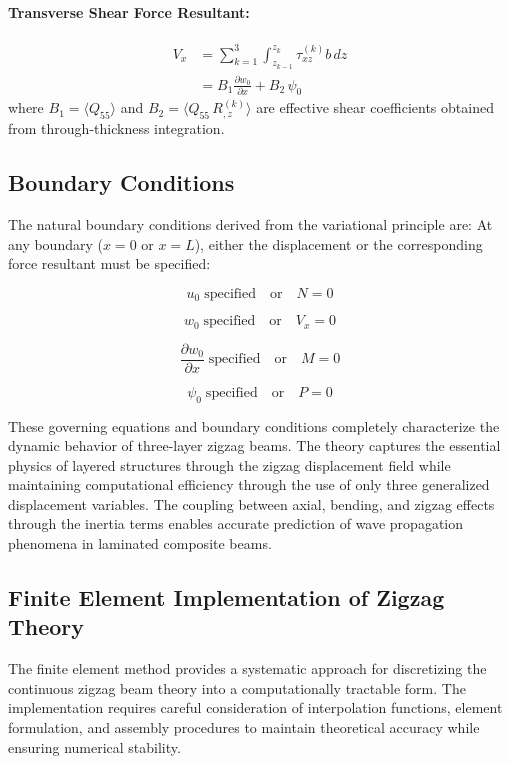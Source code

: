 \documentclass[12pt,a4paper]{report}
\begin{document}
\paragraph{Transverse Shear Force Resultant:}
\begin{align}
V_x &= \sum_{k=1}^{3} \int_{z_{k-1}}^{z_k} \tau_{xz}^{(k)} b \, dz \nonumber \\
    &= B_{1} \frac{\partial w_0}{\partial x} + B_{2} \, \psi_0
\end{align}
where $B_{1} = \langle Q_{55} \rangle$ and $B_{2} = \langle Q_{55} \, R^{(k)}_{,z} \rangle$ are effective shear coefficients obtained from through-thickness integration.

\subsection*{Boundary Conditions}

The natural boundary conditions derived from the variational principle are:  
At any boundary ($x = 0$ or $x = L$), either the displacement or the corresponding force resultant must be specified:

\[
u_0 \; \text{specified} \quad \text{or} \quad N = 0
\]

\[
w_0 \; \text{specified} \quad \text{or} \quad V_x = 0
\]

\[
\frac{\partial w_0}{\partial x} \; \text{specified} \quad \text{or} \quad M = 0
\]

\[
\psi_0 \; \text{specified} \quad \text{or} \quad P = 0
\]

These governing equations and boundary conditions completely characterize the dynamic behavior of three-layer zigzag beams. The theory captures the essential physics of layered structures through the zigzag displacement field while maintaining computational efficiency through the use of only three generalized displacement variables. The coupling between axial, bending, and zigzag effects through the inertia terms enables accurate prediction of wave propagation phenomena in laminated composite beams.

\subsection{Finite Element Implementation of Zigzag Theory}

The finite element method provides a systematic approach for discretizing the continuous zigzag beam theory into a computationally tractable form. The implementation requires careful consideration of interpolation functions, element formulation, and assembly procedures to maintain theoretical accuracy while ensuring numerical stability.
\end{document}
